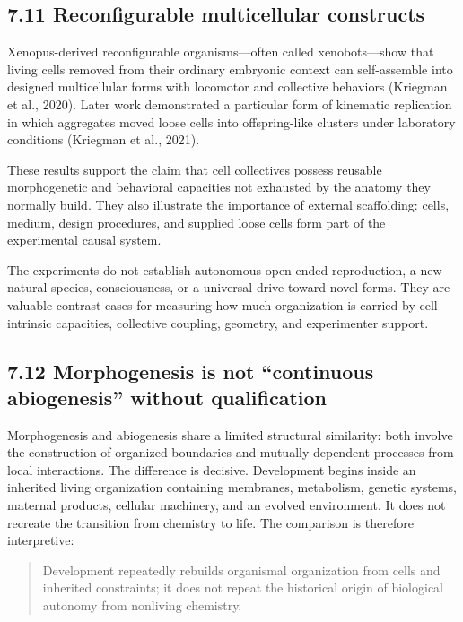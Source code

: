 \documentclass[
  11pt,
]{article}
\begin{document}
\subsection{7.11 Reconfigurable multicellular
constructs}\label{reconfigurable-multicellular-constructs}

Xenopus-derived reconfigurable organisms---often called xenobots---show
that living cells removed from their ordinary embryonic context can
self-assemble into designed multicellular forms with locomotor and
collective behaviors (Kriegman et al., 2020). Later work demonstrated a
particular form of kinematic replication in which aggregates moved loose
cells into offspring-like clusters under laboratory conditions (Kriegman
et al., 2021).

These results support the claim that cell collectives possess reusable
morphogenetic and behavioral capacities not exhausted by the anatomy
they normally build. They also illustrate the importance of external
scaffolding: cells, medium, design procedures, and supplied loose cells
form part of the experimental causal system.

The experiments do not establish autonomous open-ended reproduction, a
new natural species, consciousness, or a universal drive toward novel
forms. They are valuable contrast cases for measuring how much
organization is carried by cell-intrinsic capacities, collective
coupling, geometry, and experimenter support.

\subsection{7.12 Morphogenesis is not ``continuous abiogenesis'' without
qualification}\label{morphogenesis-is-not-continuous-abiogenesis-without-qualification}

Morphogenesis and abiogenesis share a limited structural similarity:
both involve the construction of organized boundaries and mutually
dependent processes from local interactions. The difference is decisive.
Development begins inside an inherited living organization containing
membranes, metabolism, genetic systems, maternal products, cellular
machinery, and an evolved environment. It does not recreate the
transition from chemistry to life. The comparison is therefore
interpretive:

\begin{quote}
Development repeatedly rebuilds organismal organization from cells and
inherited constraints; it does not repeat the historical origin of
biological autonomy from nonliving chemistry.
\end{quote}
\end{document}
